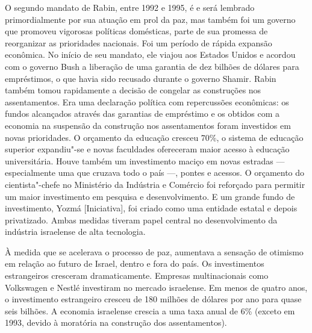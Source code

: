 O segundo mandato de Rabin, entre 1992 e 1995, é e será lembrado
primordialmente por sua atuação em prol da paz, mas também foi um
governo que promoveu vigorosas políticas domésticas, parte de sua promessa
de reorganizar as prioridades nacionais. Foi um período de
rápida expansão econômica. No início de seu mandato, ele viajou aos
Estados Unidos e acordou com o governo Bush a liberação de uma garantia
de dez bilhões de dólares para empréstimos, o que havia sido recusado durante o
governo Shamir. Rabin também tomou rapidamente a decisão de congelar as
construções nos assentamentos. Era uma declaração política com
repercussões econômicas: os fundos alcançados através das garantias de
empréstimo e os obtidos com a economia na suspensão da construção nos
assentamentos foram investidos em novas prioridades. O orçamento da
educação cresceu 70\%, o sistema de educação superior expandiu"-se e novas faculdades
ofereceram maior acesso à educação universitária. Houve também um investimento maciço em novas estradas --- especialmente uma que cruzava todo o país ---, pontes e
acessos. O orçamento do
cientista"-chefe no Ministério da Indústria e Comércio foi reforçado para
permitir um maior investimento em pesquisa e desenvolvimento. E um
grande fundo de investimento, Yozmá {[}Iniciativa{]}, foi criado como
uma entidade estatal e depois privatizado. Ambas medidas tiveram papel
central no desenvolvimento da indústria israelense de alta tecnologia.

À medida que se acelerava o processo de paz, aumentava a sensação de
otimismo em relação ao futuro de Israel, dentro e fora do país. Os
investimentos estrangeiros cresceram dramaticamente. Empresas
multinacionais como Volkswagen e Nestlé investiram no mercado
israelense. Em menos de quatro anos, o investimento estrangeiro cresceu
de 180 milhões de dólares por ano para quase seis bilhões. A economia
israelense crescia a uma taxa anual de 6\% (exceto em 1993, devido à
moratória na construção dos assentamentos).

